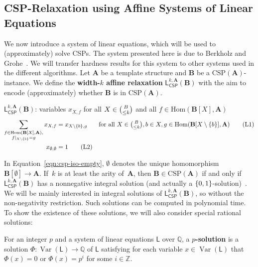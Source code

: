 \documentclass[a4paper,english, thm-restate]{lipics-v2021}
\newcommand{\ZZ}{\mathbb{Z}}
\newcommand{\QQ}{\mathbb{Q}}
\newcommand{\defining}[1]{\textbf{#1}}
\DeclarePairedDelimiter\set{\lbrace}{\rbrace}
\newcommand{\StructA}{\mathbf{A}}
\newcommand{\StructB}{\mathbf{B}}
\newcommand{\CSP}[1]{\mathrm{CSP}(#1)}
\newcommand{\restrict}[2]{#1|_{#2}}
\newcommand{\Hom}[2]{\mathrm{Hom}(#1,#2)}
\newcommand{\leqs}{\mathsf{L}}
\newcommand{\cspiso}[3]{\leqs^{#1,#2}_{\mathsf{CSP}}(#3)}
\newcommand{\Var}[1]{\operatorname*{Var}(#1)}
\begin{document}
	\subsection{CSP-Relaxation using Affine Systems of Linear Equations}
	\label{sec:linearEquationSystem}
	We now introduce a system of linear equations,
	which will be used to (approximately) solve CSPs.
	The system presented here is due to Berkholz and Grohe~\cite{BerkholzGrohe2015}.
	We will transfer hardness results for this system
	to other systems used in the different algorithms.
	Let $\StructA$ be a template structure and $\StructB$ be a $\CSP{\StructA}$-instance.
	We define the \defining{width-$k$ affine relaxation} $\cspiso{k}{\StructA}{\StructB}$
	with the aim to encode (approximately) whether $\StructB$ is in $\CSP{\StructA}$. 
	\begin{systembox}{$\cspiso{k}{\StructA}{\StructB}$: variables $x_{X,f}$
			for all $X \in \tbinom{B}{\leq k}$ and all $f \in  \Hom{\StructB[X]}{\StructA}$}
		\begin{align*}
			\sum_{\substack{f \in \Hom{\StructB[X]}{\StructA},\\ \restrict{f}{X\setminus\set{b}} = g}} x_{X,f} &=  x_{X\setminus{\set{b}},g}  &\text{for all } X \in \tbinom{B}{\leq k}, b \in X, g \in \Hom{\StructB[X\setminus\set{b}]}{\StructA} \label{eqn:csp-iso-agree}\tag{L1} \\
			x_{\emptyset,\emptyset }&= 1\label{eqn:csp-iso-empty}\tag{L2}
		\end{align*}
	\end{systembox}
	\noindent In Equation~\ref{eqn:csp-iso-empty}, $\emptyset$ denotes the unique homomorphism $\StructB[\emptyset] \to \StructA$.
	If~$k$ is at least the arity of~$\StructA$, then
	$\StructB \in \CSP{\StructA}$ if and only if $\cspiso{k}{\StructA}{\StructB}$
	has a nonnegative integral solution (and actually a $\set{0,1}$-solution)~\cite{BerkholzGrohe2015}.
	We will be mainly interested in
	integral solutions of $\cspiso{k}{\StructA}{\StructB}$,
	so without the non-negativity restriction.
	Such solutions can be computed in polynomial time.
	To show the existence of these solutions,
	we will also consider special rational solutions:
	
	\begin{definition}[$p$-Solution]
		For an integer $p$ and a system of linear equations $\leqs$ over $\QQ$,
		a \defining{$p$\nobreakdash-solution} is a solution $\Phi \colon \Var{\leqs} \to \QQ$ 
		of $\leqs$ satisfying for each variable $x \in \Var{\leqs}$ that
		$\Phi(x)=0$ or $\Phi(x) =p^i$ for some $i \in \ZZ$.
	\end{definition}
	\pqSolutionImpliesIntegral*
	
\end{document}
